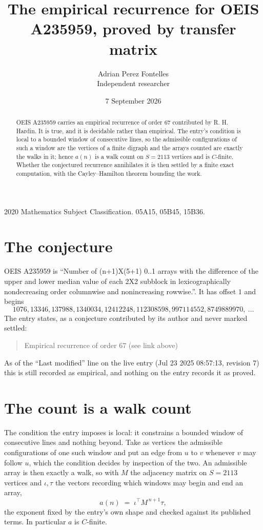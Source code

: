 \documentclass[11pt,a4paper]{article}
\title{The empirical recurrence for OEIS A235959, proved by transfer matrix}
\author{Adrian Perez Fontelles\\ \small Independent researcher}
\date{7 September 2026}
\theoremstyle{plain}
\theoremstyle{definition}
\begin{document}
\maketitle

\begin{abstract}
OEIS A235959 carries an empirical recurrence of order $67$ contributed by R. H. Hardin. It is
true, and it is decidable rather than empirical. The entry's condition is local to a bounded window of consecutive lines, so
the admissible configurations of such a window are the vertices of a finite digraph and the
arrays counted are exactly the walks in it; hence $a(n)$ is a walk count on $S=2113$ vertices
and is $C$-finite. Whether the conjectured recurrence annihilates it is then settled by a
finite exact computation, with the Cayley--Hamilton theorem bounding the work.
\end{abstract}

\noindent\small 2020 Mathematics Subject Classification. 05A15, 05B45, 15B36.\normalsize

\section{The conjecture}

OEIS A235959 is ``Number of (n+1)X(5+1) 0..1 arrays with the difference of the upper and lower median value of each 2X2 subblock in lexicographically nondecreasing order columnwise and nonincreasing rowwise.''. It has offset $1$ and begins
\[
1076, 13346, 137988, 1340034, 12412248, 112308598, 997114552, 8749889970,\ \dots
\]
The entry states, as a conjecture contributed by its author and never marked settled:
\begin{quote}
Empirical recurrence of order 67 (see link above)
\end{quote}
As of the ``Last modified'' line on the live entry (Jul 23 2025 08:57:13, revision 7) this is still
recorded as empirical, and nothing on the entry records it as proved.

\section{The count is a walk count}

The condition the entry imposes is local: it constrains a bounded window of consecutive lines and nothing beyond. Take as
vertices the admissible configurations of one such window and put an edge from $u$ to $v$
whenever $v$ may follow $u$, which the condition decides by inspection of the two. An
admissible array is then exactly a walk, so with $M$ the adjacency matrix on $S=2113$ vertices
and $\iota,\tau$ the vectors recording which windows may begin and end an array,
\[
a(n)\;=\;\iota^{\!\top}M^{\,n+1}\tau ,
\]
the exponent fixed by the entry's own shape and checked against its published terms. In
particular $a$ is $C$-finite.
\end{document}
